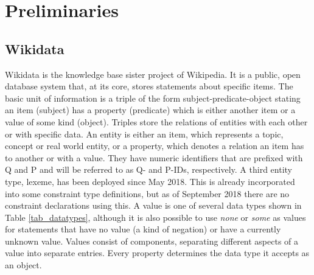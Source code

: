 \documentclass[hyperref,bachelorofscience,fleqn]{cgvpub}
\begin{document}
\chapter{Preliminaries}\label{cha_preliminaries}
\section{Wikidata}\label{sec_wikidata}
Wikidata is the knowledge base sister project of Wikipedia. It is a public, open database system that, at its core, stores statements about specific items. The basic unit of information is a triple of the form subject-predicate-object stating an item (subject) has a property (predicate) which is either another item or a value of some kind (object). Triples store the relations of entities with each other or with specific data. An entity is either an item, which represents a topic, concept or real world entity, or a property, which denotes a relation an item has to another or with a value. They have numeric identifiers that are prefixed with Q and P and will be referred to as Q- and P-IDs, respectively. A third entity type, lexeme, has been deployed since May 2018. This is already incorporated into some constraint type definitions, but as of September 2018 there are no constraint declarations using this. A value is one of several data types shown in Table \ref{tab_datatypes}, although it is also possible to use \emph{none} or \emph{some} as values for statements that have no value (a kind of negation) or have a currently unknown value. Values consist of components, separating different aspects of a value into separate entries. Every property determines the data type it accepts as an object. \\
\end{document}
